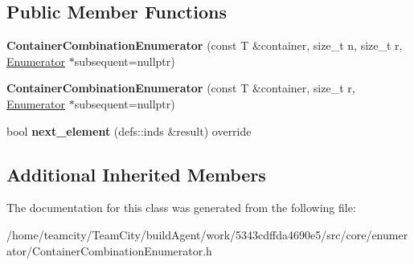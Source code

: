 \subsection*{Public Member Functions}
\begin{DoxyCompactItemize}
\item 
{\bfseries Container\+Combination\+Enumerator} (const T \&container, size\+\_\+t n, size\+\_\+t r, \hyperlink{classEnumerator}{Enumerator} $\ast$subsequent=nullptr)\hypertarget{classContainerCombinationEnumerator_ad3766343b798d5e95a94aa90f05fccfe}{}\label{classContainerCombinationEnumerator_ad3766343b798d5e95a94aa90f05fccfe}

\item 
{\bfseries Container\+Combination\+Enumerator} (const T \&container, size\+\_\+t r, \hyperlink{classEnumerator}{Enumerator} $\ast$subsequent=nullptr)\hypertarget{classContainerCombinationEnumerator_aa0f06fe46f5a701b0c47aa4ca5e7531e}{}\label{classContainerCombinationEnumerator_aa0f06fe46f5a701b0c47aa4ca5e7531e}

\item 
bool {\bfseries next\+\_\+element} (defs\+::inds \&result) override\hypertarget{classContainerCombinationEnumerator_a5ae4cc19cd270528b56f5f9f2b9d5fd5}{}\label{classContainerCombinationEnumerator_a5ae4cc19cd270528b56f5f9f2b9d5fd5}

\end{DoxyCompactItemize}
\subsection*{Additional Inherited Members}


The documentation for this class was generated from the following file\+:\begin{DoxyCompactItemize}
\item 
/home/teamcity/\+Team\+City/build\+Agent/work/5343cdffda4690e5/src/core/enumerator/Container\+Combination\+Enumerator.\+h\end{DoxyCompactItemize}
